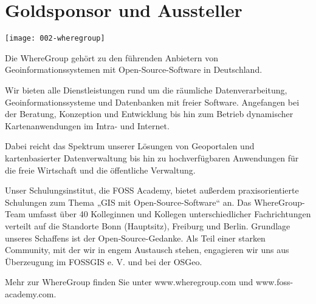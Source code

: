 \section*{Goldsponsor und Aussteller}
\begin{center}
  \texttt{[image: 002-wheregroup]}
\end{center}
Die WhereGroup gehört zu den führenden Anbietern von Geoinformationssystemen
mit Open-Source-Software in Deutschland.

Wir bieten alle Dienstleistungen rund um die räumliche Datenverarbeitung,
Geoinformationssysteme und Datenbanken mit freier Software. Angefangen bei der
Beratung, Konzeption und Entwicklung bis hin zum Betrieb dynamischer
Kartenanwendungen im Intra- und Internet.

Dabei reicht das Spektrum unserer Lösungen von Geoportalen und kartenbasierter
Datenverwaltung bis hin zu hochverfügbaren Anwendungen für die freie Wirtschaft
und die öffentliche Verwaltung.

Unser Schulungsinstitut, die FOSS Academy, bietet außerdem praxisorientierte
Schulungen zum Thema „GIS mit Open-Source-Software“ an. Das WhereGroup-Team
umfasst über 40 Kolleginnen und Kollegen unterschiedlicher Fachrichtungen verteilt auf die
Standorte Bonn (Hauptsitz), Freiburg und Berlin. Grundlage unseres Schaffens
ist der Open-Source-Gedanke. Als Teil einer starken Community, mit der wir in
engem Austausch stehen, engagieren wir uns aus Überzeugung im FOSSGIS e. V. und
bei der OSGeo.

Mehr zur WhereGroup finden Sie unter www.wheregroup.com und www.foss-academy.com.

